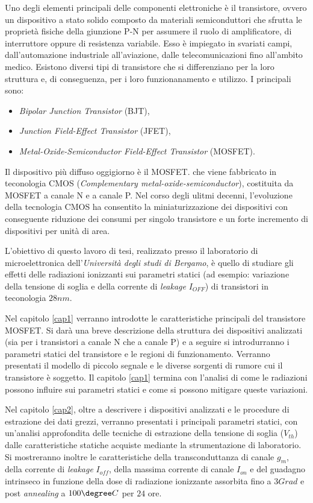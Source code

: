 Uno degli elementi principali delle componenti elettroniche è il transistore, ovvero un dispositivo a stato solido composto da materiali semiconduttori che sfrutta le proprietà fisiche della giunzione P-N per assumere il ruolo di amplificatore, di interruttore oppure di resistenza variabile.
Esso è impiegato in svariati campi, dall'automazione industriale all'aviazione, dalle telecomunicazioni fino all'ambito medico.
Esistono diversi tipi di transistore che si differenziano per la loro struttura e, di conseguenza, per i loro funzionanamento e utilizzo. I principali sono:
\begin{itemize}
    \item \textit{Bipolar Junction Transistor} (BJT),
    \item \textit{Junction Field-Effect Transistor} (JFET),
    \item \textit{Metal-Oxide-Semiconductor Field-Effect Transistor} (MOSFET).
\end{itemize}
Il dispositivo più diffuso oggigiorno è il MOSFET. che viene fabbricato in teconologia CMOS (\textit{Complementary metal-oxide-semiconductor}), costituita da MOSFET a canale N e a canale P. Nel corso degli ulitmi decenni, l'evoluzione della tecnologia CMOS ha consentito la miniaturizzazione dei dispositivi con conseguente riduzione dei consumi per singolo transistore e un forte incremento di dispositivi per unità di area.

\vspace*{0.5cm}

L'obiettivo di questo lavoro di tesi, realizzato presso il laboratorio di microelettronica dell'\textit{Università degli studi di Bergamo}, è quello di studiare gli effetti delle radiazioni ionizzanti sui parametri statici (ad esempio: variazione della tensione di soglia e della corrente di \emph{leakage} $I_{OFF}$) di transistori in teconologia $28nm$. 

\vspace*{0.5cm}

Nel capitolo \ref{cap1} verranno introdotte le caratteristiche principali del transistore MOSFET.
Si darà una breve descrizione della struttura dei dispositivi analizzati (sia per i transistori a canale N che a canale P) e a seguire si introdurranno i parametri statici del transistore e le regioni di funzionamento. Verranno presentati il modello di piccolo segnale e le diverse sorgenti di rumore cui il transistore è soggetto. Il capitolo \ref{cap1} termina con l'analisi di come le radiazioni possono influire sui parametri statici e come si possono mitigare queste variazioni.

Nel capitolo \ref{cap2}, oltre a descrivere i dispositivi analizzati e le procedure di estrazione dei dati grezzi, verranno presentati i principali parametri statici, con un'analisi approfondita delle tecniche di estrazione della tensione di soglia ($V_{th}$) dalle caratteristiche statiche acquiste mediante la strumentazione di laboratorio. Si mostreranno inoltre le caratteristiche della transconduttanza di canale $g_m$, della corrente di \emph{leakage} $I_{off}$, della massima corrente di canale $I_{on}$ e del guadagno intrinseco in funzione della dose di radiazione ionizzante assorbita fino a $3 Grad$ e post \emph{annealing} a $100\degree C$ per $24$ ore.
